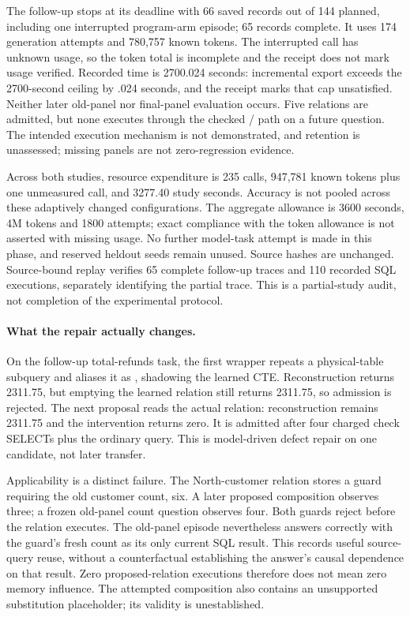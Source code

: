 The follow-up stops at its deadline with 66 saved records out of 144 planned,
including one interrupted program-arm episode; 65 records complete. It uses
174 generation attempts and 780,757 known tokens. The interrupted call has
unknown usage, so the token total is incomplete and the receipt does not mark
usage verified. Recorded time is 2700.024 seconds: incremental export exceeds
the 2700-second ceiling by .024 seconds, and the receipt marks that cap
unsatisfied. Neither later old-panel nor final-panel evaluation occurs. Five
relations are admitted, but none executes through the checked /
path on a future question.
The intended execution mechanism is not demonstrated, and retention is
unassessed; missing panels are not zero-regression evidence.

Across both studies, resource expenditure is 235 calls, 947,781 known tokens
plus one unmeasured call, and 3277.40 study seconds. Accuracy is not pooled
across these adaptively changed configurations. The aggregate allowance is
3600 seconds, 4M tokens and 1800 attempts; exact compliance with the token
allowance is not asserted with missing usage. No further model-task attempt is
made in this phase, and reserved heldout seeds remain unused. Source hashes are
unchanged. Source-bound replay verifies 65 complete follow-up traces and 110
recorded SQL executions, separately identifying the partial trace. This is a
partial-study audit, not completion of the experimental protocol.

\paragraph{What the repair actually changes.}
On the follow-up total-refunds task, the first wrapper repeats a physical-table
subquery and aliases it as , shadowing the learned CTE.
Reconstruction returns 2311.75, but emptying the learned relation still returns
2311.75, so admission is rejected. The next proposal reads the actual
 relation: reconstruction remains 2311.75 and the intervention
returns zero. It is admitted after four charged check SELECTs plus the ordinary
query. This is model-driven defect repair on one candidate, not later transfer.

Applicability is a distinct failure. The North-customer relation stores a guard
requiring the old customer count, six. A later proposed composition observes
three; a frozen old-panel count question observes four. Both guards reject
before the relation executes. The old-panel episode nevertheless answers
correctly with the guard's fresh count as its only current SQL result. This
records useful source-query reuse, without a counterfactual establishing the
answer's causal dependence on that result. Zero proposed-relation executions
therefore does not mean zero memory influence. The attempted composition also
contains an unsupported substitution placeholder; its validity is unestablished.


